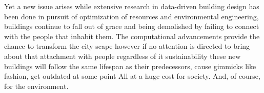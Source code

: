 Yet a new issue arises while extensive research in data-driven building design has been done in pursuit of optimization of resources and environmental engineering, buildings continue to fall out of grace and being demolished by failing to connect with the people that inhabit them.
The computational advancements provide the chance to transform the city scape however if no attention is directed to bring about that attachment with people regardless of it sustainability these new buildings will follow the same lifespan as their predecessors, cause gimmicks like fashion, get outdated at some point All at a huge cost for society. And, of course, for the environment. \cite{Brielmann2022}
